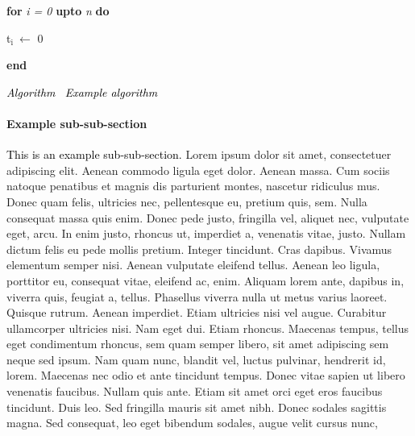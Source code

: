 \documentclass[a4paper]{article}
\providecommand\textsubscript[1]{\ensuremath{{}_{\text{#1}}}}
\newcounter{Algorithm}
\renewcommand\theAlgorithm{\arabic{Algorithm}}
\begin{document}
\bigskip


\bigskip

\textbf{for} \textit{i = 0} \textbf{upto} \textit{n} \textbf{do} 

t\textsubscript{i }$\leftarrow $ 0 

\textbf{end }

{\itshape\color[rgb]{0.26666668,0.32941177,0.41568628}
\textcolor{black}{Algorithm \stepcounter{Algorithm}{\theAlgorithm}\ Example algorithm}}


\bigskip


\bigskip

\paragraph{Example sub-sub-section}

\bigskip

\textcolor{black}{This is an example sub-sub-section. }Lorem ipsum dolor sit amet, consectetuer adipiscing elit. Aenean
commodo ligula eget dolor. Aenean massa. Cum sociis natoque penatibus et magnis dis parturient montes, nascetur
ridiculus mus. Donec quam felis, ultricies nec, pellentesque eu, pretium quis, sem. Nulla consequat massa quis enim.
Donec pede justo, fringilla vel, aliquet nec, vulputate eget, arcu. In enim justo, rhoncus ut, imperdiet a, venenatis
vitae, justo. Nullam dictum felis eu pede mollis pretium. Integer tincidunt. Cras dapibus. Vivamus elementum semper
nisi. Aenean vulputate eleifend tellus. Aenean leo ligula, porttitor eu, consequat vitae, eleifend ac, enim. Aliquam
lorem ante, dapibus in, viverra quis, feugiat a, tellus. Phasellus viverra nulla ut metus varius laoreet. Quisque
rutrum. Aenean imperdiet. Etiam ultricies nisi vel augue. Curabitur ullamcorper ultricies nisi. Nam eget dui. Etiam
rhoncus. Maecenas tempus, tellus eget condimentum rhoncus, sem quam semper libero, sit amet adipiscing sem neque sed
ipsum. Nam quam nunc, blandit vel, luctus pulvinar, hendrerit id, lorem. Maecenas nec odio et ante tincidunt tempus.
Donec vitae sapien ut libero venenatis faucibus. Nullam quis ante. Etiam sit amet orci eget eros faucibus tincidunt.
Duis leo. Sed fringilla mauris sit amet nibh. Donec sodales sagittis magna. Sed consequat, leo eget bibendum sodales,
augue velit cursus nunc,


\bigskip
\end{document}
